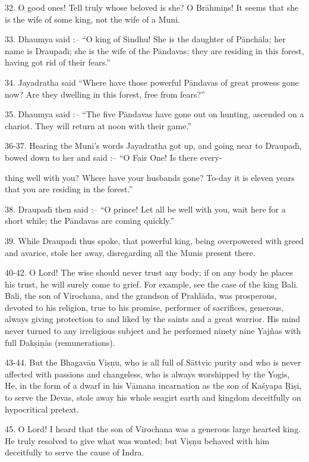 32. O good ones! Tell truly whose beloved is she? O Br\=ahmi\d{n}s! It seems that she is the wife of some king, not the wife of a Muni.

33. Dhaumya said :-- ``O king of Sindhu! She is the daughter of P\=anch\=ala; her name is Draupad\={\i}; she is the wife of the P\=andavas; they are residing in this forest, having got rid of their fears.''

34. Jayadratha said ``Where have those powerful P\=andavas of great prowess gone now? Are they dwelling in this forest, free from fears?''

35. Dhaumya said :-- ``The five P\=andavas have gone out on hunting, ascended on a chariot. They will return at noon with their game.''

36-37. Hearing the Muni's words Jayadratha got up, and going near to Draupad\={\i}, bowed down to her and said :-- ``O Fair One! Is there every-

thing well with you? Where have your husbands gone? To-day it is eleven years that you are residing in the forest.''

38. Draupad\={\i} then said :-- ``O prince! Let all be well with you, wait here for a short while; the P\=andavas are coming quickly.''

39. While Draupad\={\i} thus spoke, that powerful king, being overpowered with greed and avarice, stole her away, disregarding all the Munis present there.

40-42. O Lord! The wise should never trust any body; if on any body he places his trust, he will surely come to grief. For example, see the case of the king Bali. Bali, the son of Virochana, and the grandson of Prahl\=ada, was prosperous, devoted to his religion, true to his promise, performer of sacrifices, generous, always giving protection to and liked by the saints and a great warrior. His mind never turned to any irreligious subject and he performed ninety nine Yaj\~nas with full Dak\d{s}i\d{n}\=as (remunerations).

43-44. But the Bhagav\=an Vi\d{s}\d{n}u, who is all full of S\=attvic purity and who is never affected with passions and changeless, who is always worshipped by the Yogis, He, in the form of a dwarf in his V\=amana incarnation as the son of Ka\'syapa \d{R}i\d{s}i, to serve the Devas, stole away his whole seagirt earth and kingdom deceitfully on hypocritical pretext.

45. O Lord! I heard that the son of Virochana was a generous large hearted king. He truly resolved to give what was wanted; but Vi\d{s}\d{n}u behaved with him deceitfully to serve the cause of Indra.

